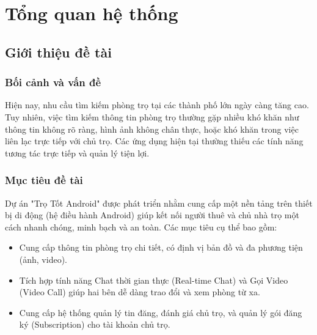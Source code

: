 
\chapter{Tổng quan hệ thống}

\section{Giới thiệu đề tài}

\subsection{Bối cảnh và vấn đề}
Hiện nay, nhu cầu tìm kiếm phòng trọ tại các thành phố lớn ngày càng tăng cao. Tuy nhiên, việc tìm kiếm thông tin phòng trọ thường gặp nhiều khó khăn như thông tin không rõ ràng, hình ảnh không chân thực, hoặc khó khăn trong việc liên lạc trực tiếp với chủ trọ. Các ứng dụng hiện tại thường thiếu các tính năng tương tác trực tiếp và quản lý tiện lợi.

\subsection{Mục tiêu đề tài}
Dự án "Trọ Tốt Android" được phát triển nhằm cung cấp một nền tảng trên thiết bị di động (hệ điều hành Android) giúp kết nối người thuê và chủ nhà trọ một cách nhanh chóng, minh bạch và an toàn. Các mục tiêu cụ thể bao gồm:
\begin{itemize}
    \item Cung cấp thông tin phòng trọ chi tiết, có định vị bản đồ và đa phương tiện (ảnh, video).
    \item Tích hợp tính năng Chat thời gian thực (Real-time Chat) và Gọi Video (Video Call) giúp hai bên dễ dàng trao đổi và xem phòng từ xa.
    \item Cung cấp hệ thống quản lý tin đăng, đánh giá chủ trọ, và quản lý gói đăng ký (Subscription) cho tài khoản chủ trọ.
\end{itemize}


